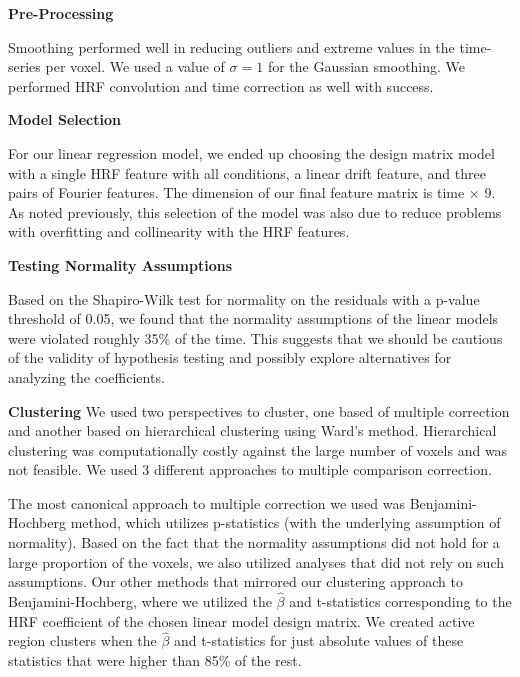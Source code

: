 
\noindent \textbf{Pre-Processing}

Smoothing performed well in reducing outliers and extreme values in the 
time-series per voxel. We used a value of $\sigma=1$ for the Gaussian 
smoothing. We performed HRF convolution and time correction as well with 
success.
\vspace{5mm}

\noindent \textbf{Model Selection}

For our linear regression model, we ended up choosing the design matrix model 
with a single HRF feature with all conditions, a linear drift feature, and 
three pairs of Fourier features. The dimension of our final feature matrix is 
time $\times$ 9. As noted previously, this selection of the model was also 
due to reduce problems with overfitting and collinearity with the HRF 
features. 
\vspace{5mm}

\noindent \textbf{Testing Normality Assumptions}

Based on the Shapiro-Wilk test for normality on the residuals with a p-value 
threshold of 0.05, we found that the normality assumptions of the linear 
models were violated roughly 35\% of the time. This suggests that we should be 
cautious of the validity of hypothesis testing and possibly explore 
alternatives for analyzing the coefficients.
\vspace{5mm}

\noindent \textbf{Clustering}
We used two perspectives to cluster, one based of multiple correction and 
another based on hierarchical clustering using Ward's method. Hierarchical 
clustering was computationally costly against the large number of voxels and 
was not feasible. We used 3 different approaches to multiple comparison 
correction. 

The most canonical approach to multiple correction we used was Benjamini-
Hochberg method, which utilizes p-statistics (with the underlying assumption 
of normality). Based on the fact that the normality assumptions did not hold 
for a large proportion of the voxels, we also utilized analyses that did not 
rely on such assumptions. Our other methods that mirrored our clustering 
approach to Benjamini-Hochberg, where we utilized the $\hat{\beta}$ and 
t-statistics corresponding to the HRF coefficient of the chosen linear model 
design matrix. We created active region clusters when the $\hat{\beta}$ and 
t-statistics for just absolute values of these statistics that were higher 
than 85\% of the rest.
\vspace{5mm}



